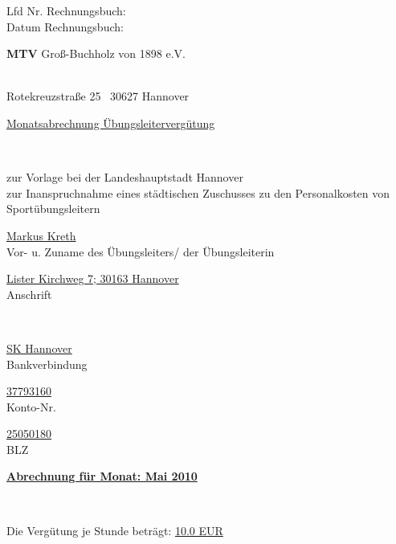 \documentclass[a4paper,10pt,BCOR=0mm]{scrreprt}
\begin{document}
\begin{flushright}
\parbox{6cm}{Lfd Nr. Rechnungsbuch: \hrulefill \\
Datum Rechnungsbuch: \hrulefill }
\end{flushright}
\begin{center}
\begin{Large}\textbf{MTV} Groß-Buchholz von 1898 e.V.                                        \end{Large}\\
Rotekreuzstraße 25 \textperiodcentered\ 30627 Hannover\\[.4cm]
\begin{huge}\underline{Monatsabrechnung Übungsleitervergütung}\end{huge}\\
\begin{scriptsize}zur Vorlage bei der Landeshauptstadt Hannover\\
zur Inanspruchnahme eines städtischen Zuschusses zu den Personalkosten von Sportübungsleitern\\[.7cm]
\end{scriptsize}

\parbox{0,49\textwidth}{
\begin{center}
\hrulefill\underline{Markus Kreth}\hrulefill\\
Vor- u. Zuname des Übungsleiters/ der Übungsleiterin
\end{center}
}
\hfill
\parbox{0,49\textwidth}{\begin{center}
\hrulefill\underline{Lister Kirchweg 7; 30163 Hannover}\hrulefill\\
Anschrift\end{center}}\\[.7cm]
\parbox{0,32\textwidth}{
\begin{center}
\hrulefill\underline{SK Hannover}\hrulefill\\
Bankverbindung
\end{center}
}
\hfill
\parbox{0,32\textwidth}{
\begin{center}
\hrulefill\underline{37793160}\hrulefill\\
Konto-Nr.
\end{center}
}
\hfill
\parbox{0,32\textwidth}{
\begin{center}
\hrulefill\underline{25050180}\hrulefill\\
BLZ
\end{center}
}
\parbox{12cm}{\begin{large}\underline{\textbf{Abrechnung für Monat: Mai 2010}}\end{large}}\\
\parbox{9cm}{Die Vergütung je Stunde beträgt: \underline{10.0 EUR}}
\end{center}\begin{flushright}


\end{flushright}
\end{document}
